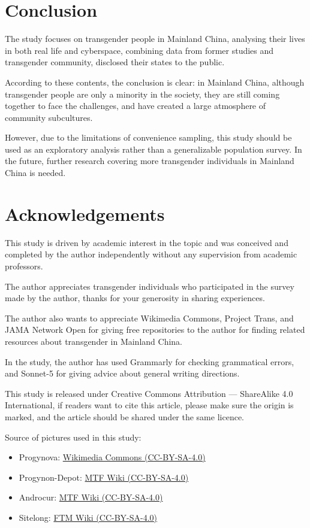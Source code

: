 \documentclass{article}
\begin{document}

	\section{Conclusion}
	The study focuses on transgender people in Mainland China, analysing their lives in both real life and cyberspace, combining data from former studies and transgender community, disclosed their states to the public.

	According to these contents, the conclusion is clear: in Mainland China, although transgender people are only a minority in the society, they are still coming together to face the challenges, and have created a large atmosphere of community subcultures.

	However, due to the limitations of convenience sampling, this study should be used as an exploratory analysis rather than a generalizable population survey. In the future, further research covering more transgender individuals in Mainland China is needed.

	\appendix
	\section*{Acknowledgements}
	This study is driven by academic interest in the topic and was conceived and completed by the author independently without any supervision from academic professors.

	The author appreciates transgender individuals who participated in the survey made by the author, thanks for your generosity in sharing experiences.

	The author also wants to appreciate Wikimedia Commons, Project Trans, and JAMA Network Open for giving free repositories to the author for finding related resources about transgender in Mainland China.

	In the study, the author has used Grammarly for checking grammatical errors, and Sonnet-5 for giving advice about general writing directions.

	This study is released under Creative Commons Attribution --- ShareAlike 4.0 International, if readers want to cite this article, please make sure the origin is marked, and the article should be shared under the same licence.

	Source of pictures used in this study:
	\begin{itemize}
		\item Progynova: \href{https://commons.wikimedia.org/wiki/File:Progynova_(estradiol_valerate)_tablets_in_the_Chinese_mainland.jpg}{Wikimedia Commons (CC-BY-SA-4.0)}
		\item Progynon-Depot: \href{https://mtf.wiki/hugo-static/images/medicine/injection/progynon-depot.jpg}{MTF Wiki (CC-BY-SA-4.0)}
		\item Androcur: \href{https://mtf.wiki/hugo-static/images/medicine/cyproterone/androcur-50.jpg}{MTF Wiki (CC-BY-SA-4.0)}
		\item Sitelong: \href{https://ftm.wiki/images/medicine/injection/sitelong.png}{FTM Wiki (CC-BY-SA-4.0)}
	\end{itemize}

	\clearpage
	\printbibliography{}
\end{document}
